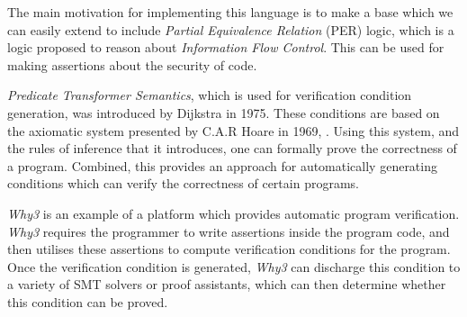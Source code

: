 The main motivation for implementing this language is to make a base which we can easily extend to include \textit{Partial Equivalence Relation} (PER) logic, which is a logic proposed to reason about \textit{Information Flow Control}\cite{}. This can be used for making assertions about the security of code.

\textit{Predicate Transformer Semantics}, which is used for verification condition generation, was introduced by Dijkstra in 1975\cite{Dijkstra}.
These conditions are based on the axiomatic system presented by C.A.R Hoare in 1969, \cite{Hoare}. Using this system, and the rules of inference that it introduces, one can formally prove the correctness of a program.
Combined, this provides an approach for automatically generating conditions which can verify the correctness of certain programs.



\textit{Why3} is an example of a platform which provides automatic program verification.
\textit{Why3} requires the programmer to write assertions inside the program code, and then utilises these assertions to compute verification conditions for the program.
Once the verification condition is generated, \textit{Why3} can discharge this condition to a variety of SMT solvers or proof assistants, which can then determine whether this condition can be proved.

